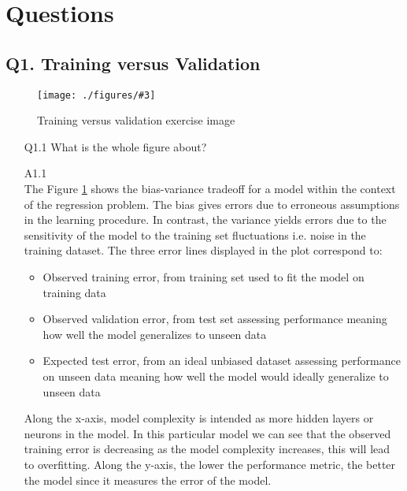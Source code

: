 \documentclass[unicode, 11pt, a4paper]{scrartcl}
\newcommand{\myFigure}[3]{
    \begin{figure}[htbp]
    \centering
    \caption{#1}
    \label{#2}
    \texttt{[image: ./figures/\#3]}
    \end{figure}
}
\begin{document}
\section*{Questions}

\subsection*{Q1. Training versus Validation}

\myFigure{Training versus validation exercise image}
{fig:ex-q1-training-vs-validation}
{ex_train_val_test.png}

\begin{itemize}
	\item[Q1.1] What is the whole figure about?
	\item[A1.1] ~\\
	      The Figure \ref{fig:ex-q1-training-vs-validation} shows the bias-variance tradeoff
	      for a model within the context of the regression problem.
	      The bias gives errors due to erroneous assumptions in the learning procedure.
	      In contrast, the variance yields errors due to the sensitivity of the model
	      to the training set fluctuations i.e. noise in the training dataset.
	      The three error lines displayed in the plot correspond to:
	      \begin{itemize}
		      \item Observed training error, from training set
		            used to fit the model on training data
		      \item Observed validation error, from test set assessing performance
		            meaning how well the model generalizes to unseen data
		      \item Expected test error, from an ideal unbiased dataset
		            assessing performance on unseen data
		            meaning how well the model would ideally generalize to unseen data
	      \end{itemize}

	      Along the x-axis, model complexity is intended as more hidden layers or neurons in the model.
	      In this particular model we can see that the observed training error
	      is decreasing as the model complexity increases, this will lead to overfitting.
	      Along the y-axis, the lower the performance metric, the better the model
	      since it measures the error of the model.


\end{itemize}
\end{document}
